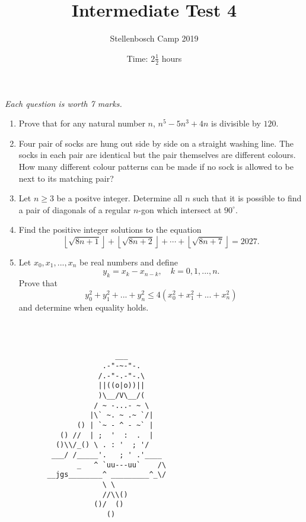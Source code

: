 \documentclass{article}
\title{Intermediate Test 4}
\author{Stellenbosch Camp 2019}
\date{Time: $2\frac{1}{2}$ hours}
\begin{document}
\maketitle
\thispagestyle{empty}

\hfill\textit{Each question is worth 7 marks.}

\vfill
\vfill


\begin{enumerate}[1.]

\item %
 Prove that for any natural number $n$, $n^5-5n^3+4n$ is divisible by $120$. 


\vfill

\item %
 Four pair of socks are hung out side by side on a straight washing line. The socks in each pair are identical but the pair themselves are different colours. How many different colour patterns can be made if no sock is allowed to be next to its matching pair?


\vfill

\item %
  Let $n\geq3$ be a positve integer. Determine all $n$ such that it is possible to find a pair of diagonals of a regular $n$-gon which intersect at $90^\circ$.


\vfill

\item %
\newcommand{\floorsqrt}[1]{\left\lfloor\sqrt{#1}\right\rfloor}
  Find the positive integer solutions to the equation
  \[ \floorsqrt{8n+1} +\floorsqrt{8n+2} +\dotsb +\floorsqrt{8n+7} = 2027. \]


\vfill

\item %
  Let $x_0, x_1,..., x_n$ be real numbers and define
  \[y_k=x_k-x_{n-k}, \quad k=0,1,...,n.\]
  Prove that 
  \[y_0^2+ y_1^2+...+ y_n^2 \leq 4(x_0^2 + x_1^2 + ... + x_n^2) \]
  and determine when equality holds.
  
        


\end{enumerate}


\vfill
\vfill
\begin{center}
\begin{BVerbatim}



                          ___
                       .-"-~-"-.
                      /.-"-.-"-.\
                      ||((o|o))||
                      )\__/V\__/(
                     / ~ -...- ~ \
                    |\` ~. ~ .~ `/|
                 () | `~ - ^ - ~` |
             () //  | ;  '  :  .  |
            ()\\/_() \ . : '  ; '/
           ___/ /_____'.   ; ' .'____
                 _   ^ `uu---uu`    /\
          __jgs________^ _________^_\/
                       \ \
                       //\\()
                     ()/  ()
                        ()

\end{BVerbatim}
\end{center}
\end{document}
